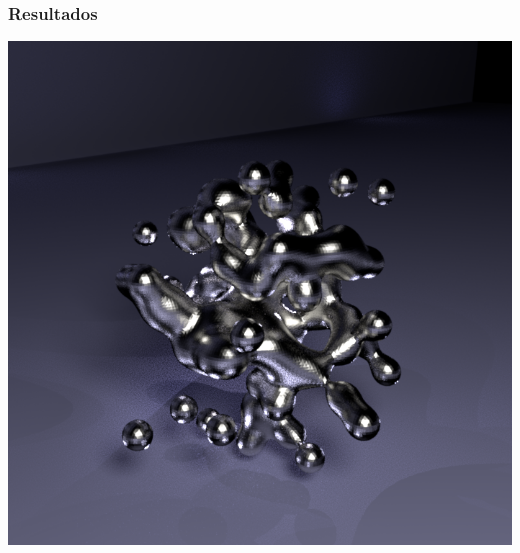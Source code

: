 \documentclass[brazil]{beamer}
\begin{document}
      \begin{frame}
        \frametitle{Resultados}
        \begin{center}
          \includegraphics[width=.6\textwidth]{imgs/metal-blob.png}
        \end{center}
      \end{frame}
\end{document}

